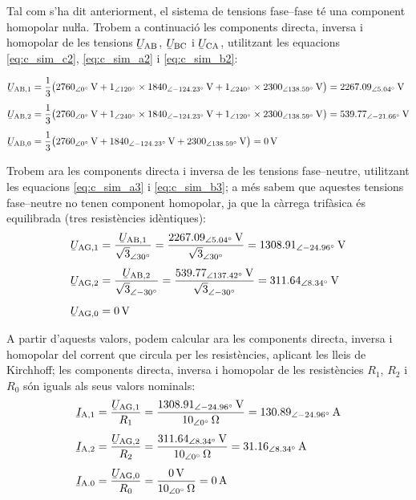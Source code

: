 \begin{exemple}
    Tal com s'ha dit anteriorment, el sistema de tensions fase--fase   té una component homopolar nuŀla.     Trobem a continuació les components directa, inversa i homopolar de les
    tensions $\cmplx{U}\ped{AB}$, $\cmplx{U}\ped{BC}$ i
    $\cmplx{U}\ped{CA}$, utilitzant les equacions
    \eqref{eq:c_sim_c2}, \eqref{eq:c_sim_a2} i \eqref{eq:c_sim_b2}:

    \begin{align*}
    \cmplx{U}\ped{AB,1} &= \frac{1}{3} \big(
    \SIpd{2760}{0}{V} + \numpd{1}{120} \times \SIpd{1840}{-124,23}{V} +
    \numpd{1}{240} \times \SIpd{2300}{138,59}{V}\big) = \SIpd{2267,09}{5,04}{V} \\[1ex]
    \cmplx{U}\ped{AB,2} &= \frac{1}{3} \big(
    \SIpd{2760}{0}{V} + \numpd{1}{240} \times \SIpd{1840}{-124,23}{V} +
    \numpd{1}{120} \times \SIpd{2300}{138,59}{V} \big) = \SIpd{539,77}{-21,66}{V} \\[1ex]
    \cmplx{U}\ped{AB,0} &= \frac{1}{3} \big(
    \SIpd{2760}{0}{V} + \SIpd{1840}{-124,23}{V} + \SIpd{2300}{138,59}{V}\big) = \SI{0}{V}
    \end{align*}

    Trobem ara les components directa i inversa
    de les tensions fase--neutre, utilitzant les equacions
    \eqref{eq:c_sim_a3} i \eqref{eq:c_sim_b3}; a més sabem que aquestes tensions fase--neutre no
    tenen component homopolar, ja que la càrrega trifàsica és equilibrada
    (tres resistències idèntiques):
    \begin{align*}
        \cmplx{U}\ped{AG,1} &=
        \frac{\cmplx{U}\ped{AB,1}}{\sqrt{3}_{\angle\ang{30}}} =
        \frac{\SIpd{2267,09}{5,04}{V}}{\sqrt{3}_{\angle\ang{30}}} =
        \SIpd{1308,91}{-24,96}{V} \\[1ex]
        \cmplx{U}\ped{AG,2} &=
        \frac{\cmplx{U}\ped{AB,2}}{\sqrt{3}_{\angle\ang{-30}}} =
        \frac{\SIpd{539,77}{137,42}{V}}{\sqrt{3}_{\angle\ang{-30}}} =
        \SIpd{311,64}{8,34}{V} \\[1ex]
        \cmplx{U}\ped{AG,0} &= \SI{0}{V}
    \end{align*}


    A partir d'aquests valors, podem calcular ara les components
    directa, inversa i homopolar del corrent que circula per les
    resistències, aplicant les lleis de Kirchhoff; les components
    directa, inversa i homopolar de les resistències $R_1$,
    $R_2$ i $R_0$ són iguals als seus valors nominals:
    \begin{align*}
    \cmplx{I}\ped{A,1} &=
    \frac{\cmplx{U}\ped{AG,1}}{R_1} =
    \frac{\SIpd{1308,91}{-24,96}{V}}{\SIpd{10}{0}{\ohm}} =
    \SIpd{130,89}{-24,96}{A} \\[1ex]
    \cmplx{I}\ped{A,2} &=
    \frac{\cmplx{U}\ped{AG,2}}{R_2} =
    \frac{\SIpd{311,64}{8,34}{V}}{\SIpd{10}{0}{\ohm}} =
    \SIpd{31,16}{8,34}{A} \\[1ex]
    \cmplx{I}\ped{A.0} &=
    \frac{\cmplx{U}\ped{AG,0}}{R_0} =
    \frac{\SI{0}{V}}{\SIpd{10}{0}{\ohm}} =
    \SI{0}{A}
    \end{align*}


\end{exemple}
